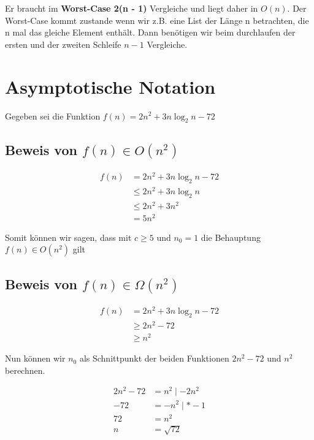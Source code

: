 \documentclass{article}
\begin{document}
Er braucht im \textbf{Worst-Case 2(n - 1)} Vergleiche und liegt daher in $O(n)$. Der Worst-Case kommt zustande wenn wir z.B. eine
List der Länge n betrachten, die n mal das gleiche Element enthält. Dann benötigen wir beim durchlaufen der ersten und der zweiten
Schleife $n - 1$ Vergleiche.

\section{Asymptotische Notation}

Gegeben sei die Funktion $f(n) = 2n^2 + 3n\log_2n - 72$

\subsection{Beweis von $f(n) \in O(n^2)$}

\begin{align*}
	f(n) & = 2n^2 + 3n\log_2n - 72 \\
	     & \leq 2n^2 + 3n\log_2n   \\
	     & \leq 2n^2 + 3n^2        \\
	     & = 5n^2
\end{align*}

\begin{flushleft}
	Somit können wir sagen, dass mit $c \geq 5$ und $n_0 = 1$ die Behauptung $f(n) \in O(n^2)$ gilt
\end{flushleft}

\subsection{Beweis von $f(n) \in \Omega(n^2)$}

\begin{align*}
	f(n) & = 2n^2 + 3n\log_2n - 72 \\
	     & \geq 2n^2 - 72          \\
	     & \geq n^2
\end{align*}

\begin{flushleft}
	Nun können wir $n_0$ als Schnittpunkt der beiden Funktionen $2n^2 - 72$ und $n^2$ berechnen.
\end{flushleft}

\begin{align*}
	2n^2 - 72 & = n^2 \mid - 2n^2 \\
	- 72      & = -n^2 \mid * -1  \\
	72        & = n^2             \\
	n         & = \sqrt{72}
\end{align*}
\end{document}
